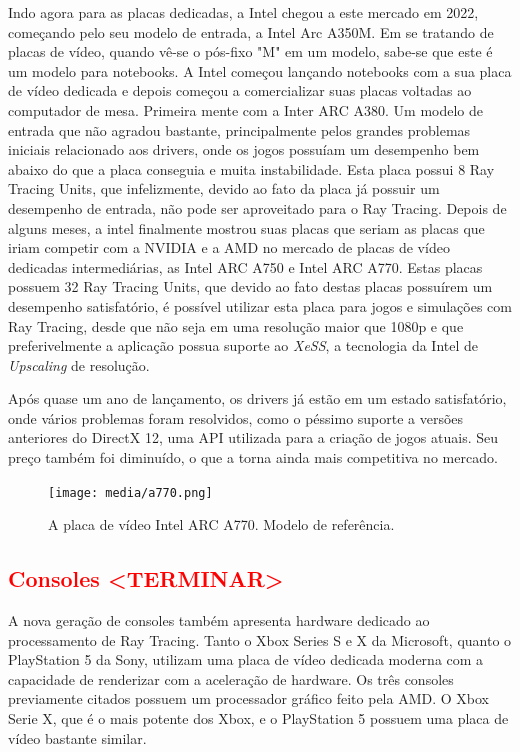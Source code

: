 \documentclass[journal]{IEEEtran}
\begin{document}
Indo agora para as placas dedicadas, a Intel chegou a este mercado em 2022, começando pelo
seu modelo de entrada, a Intel Arc A350M. Em se tratando de placas de vídeo, quando vê-se o
pós-fixo "M" em um modelo, sabe-se que este é um modelo para notebooks. A Intel começou lançando
notebooks com a sua placa de vídeo dedicada e depois começou a comercializar suas placas
voltadas ao computador de mesa. Primeira mente com a Inter ARC A380. Um modelo de entrada que
não agradou bastante, principalmente pelos grandes problemas iniciais relacionado aos drivers,
onde os jogos possuíam um desempenho bem abaixo do que a placa conseguia e muita instabilidade.
Esta placa possui 8 Ray Tracing Units, que infelizmente, devido ao fato da placa já possuir
um desempenho de entrada, não pode ser aproveitado para o Ray Tracing. Depois de alguns meses,
a intel finalmente mostrou suas placas que seriam as placas que iriam competir com a NVIDIA e
a AMD no mercado de placas de vídeo dedicadas intermediárias, as Intel ARC A750 e Intel ARC
A770. Estas placas possuem 32 Ray Tracing Units, que devido ao fato destas placas possuírem
um desempenho satisfatório, é possível utilizar esta placa para jogos e simulações com Ray 
Tracing, desde que não seja em uma resolução maior que 1080p e que preferivelmente a aplicação
possua suporte ao \emph{XeSS}, a tecnologia da Intel de \emph{Upscaling} de resolução.

Após quase um ano de lançamento, os drivers já estão em um estado satisfatório, onde vários
problemas foram resolvidos, como o péssimo suporte a versões anteriores do DirectX 12, uma
API utilizada para a criação de jogos atuais. Seu preço também foi diminuído, o que a torna
ainda mais competitiva no mercado.

\begin{figure}[ht]
  \centering
  \texttt{[image: media/a770.png]}
  \caption{A placa de vídeo Intel ARC A770. Modelo de referência.}
  \label{img_a440}
\end{figure}


\subsection{\textcolor{red}{\textbf{Consoles <TERMINAR>}}}
A nova geração de consoles também apresenta hardware dedicado ao processamento de Ray Tracing.
Tanto o Xbox Series S e X da Microsoft, quanto o PlayStation 5 da Sony, utilizam uma placa de
vídeo dedicada moderna com a capacidade de renderizar com a aceleração de hardware. Os três 
consoles previamente citados possuem um processador gráfico feito pela AMD. O Xbox Serie X,
que é o mais potente dos Xbox, e o PlayStation 5 possuem uma placa de vídeo bastante similar.
\end{document}
